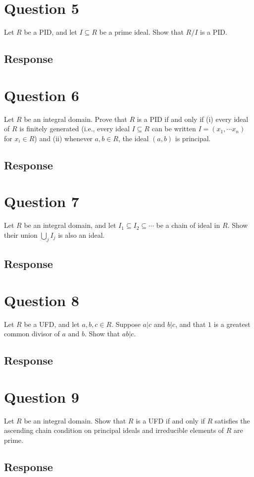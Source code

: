 \documentclass [12pt] {article}
\begin{document}


\newpage

\section*{Question 5}
Let $R$ be a PID, and let $I\subseteq R$ be a prime ideal. Show that $R/I$ is a PID.
\subsection*{Response}
\newpage

\section*{Question 6}
Let $R$ be an integral domain. Prove that $R$ is a PID if and only if (i) every ideal of $R$ is
finitely generated (i.e., every ideal $I\subseteq R$ can be written $I=(x_1,\cdots x_n)$ for
$x_i\in R$) and (ii) whenever $a, b\in R$, the ideal $(a,b)$ is principal.
\subsection*{Response}
\newpage

\section*{Question 7}
Let $R$ be an integral domain, and let $I_1\subseteq I_2\subseteq\cdots$ be a chain of ideal in $R$.
Show their union $\bigcup_j I_j$ is also an ideal.
\subsection*{Response}
\newpage

\section*{Question 8}
Let $R$ be a UFD, and let $a,b,c\in R$. Suppose $a|c$ and $b|c$, and that $1$ is a greatest common
divisor of $a$ and $b$. Show that $ab|c$.
\subsection*{Response}
\newpage

\section*{Question 9}
Let $R$ be an integral domain. Show that $R$ is a UFD if and only if $R$ satisfies the ascending
chain condition on principal ideals and irreducible elements of $R$ are prime.
\subsection*{Response}
\newpage
\end{document}
